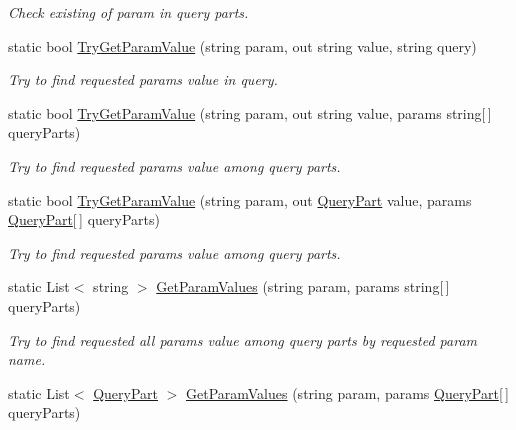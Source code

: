 \begin{DoxyCompactItemize}
\begin{DoxyCompactList}\small\item\em Check existing of param in query parts. \end{DoxyCompactList}\item 
static bool \mbox{\hyperlink{class_uniform_queries_1_1_a_p_i_a987eb23a48b90e542001cc12fcbc1ddc}{Try\+Get\+Param\+Value}} (string param, out string value, string query)
\begin{DoxyCompactList}\small\item\em Try to find requested param\textquotesingle{}s value in query. \end{DoxyCompactList}\item 
static bool \mbox{\hyperlink{class_uniform_queries_1_1_a_p_i_a5747ff73a111b583fa01c442ca2a2d78}{Try\+Get\+Param\+Value}} (string param, out string value, params string\mbox{[}$\,$\mbox{]} query\+Parts)
\begin{DoxyCompactList}\small\item\em Try to find requested param\textquotesingle{}s value among query parts. \end{DoxyCompactList}\item 
static bool \mbox{\hyperlink{class_uniform_queries_1_1_a_p_i_a57f11d169fede8dc343e8fcce0af1c6a}{Try\+Get\+Param\+Value}} (string param, out \mbox{\hyperlink{struct_uniform_queries_1_1_query_part}{Query\+Part}} value, params \mbox{\hyperlink{struct_uniform_queries_1_1_query_part}{Query\+Part}}\mbox{[}$\,$\mbox{]} query\+Parts)
\begin{DoxyCompactList}\small\item\em Try to find requested param\textquotesingle{}s value among query parts. \end{DoxyCompactList}\item 
static List$<$ string $>$ \mbox{\hyperlink{class_uniform_queries_1_1_a_p_i_aa8a8215bbad2752c291803011dc49ff4}{Get\+Param\+Values}} (string param, params string\mbox{[}$\,$\mbox{]} query\+Parts)
\begin{DoxyCompactList}\small\item\em Try to find requested all param\textquotesingle{}s value among query parts by requested param name. \end{DoxyCompactList}\item 
static List$<$ \mbox{\hyperlink{struct_uniform_queries_1_1_query_part}{Query\+Part}} $>$ \mbox{\hyperlink{class_uniform_queries_1_1_a_p_i_ae481c9b7a800886a2b461a7456043494}{Get\+Param\+Values}} (string param, params \mbox{\hyperlink{struct_uniform_queries_1_1_query_part}{Query\+Part}}\mbox{[}$\,$\mbox{]} query\+Parts)

\end{DoxyCompactItemize}
